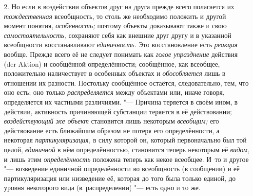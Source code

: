 2. Но если в воздействии объектов друг на друга прежде всего
полагается их {\em тождественная}
всеобщность, то столь же необходимо положить и другой момент
понятия, {\em особенность;}
поэтому объекты доказывают также и свою
{\em самостоятельность,}
сохраняют себя как внешние друг другу и в указанной
всеобщности восстанавливают
{\em единичность}. Это
восстановление есть {\em реакция}
вообще. Прежде всего её не следует понимать
как {\em голое упразднение}
действия (der Aktion) и сообщённой
определённости; сообщённое, как всеобщее, положительно наличествует в
особенных объектах и {\em обособляется}
лишь в отношении их разности. Постольку сообщённое остаётся,
следовательно, тем, что оно есть; оно только
{\em распределяется}
между объектами или, иначе говоря, определяется их частными
различиями. "--- Причина теряется в своём ином, в действии,
активность причиняющей субстанции теряется в её действовании;
{\em воздействующий же объект}
становится лишь некоторым
{\em всеобщим;} его
действование есть ближайшим образом не потеря его определённости, а
некоторая {\em партикуляризация,}
в силу которой он, который первоначально был той целой,
{\em единичной} в нём
определённостью, становится теперь некоторым её
{\em видом,} и лишь этим
{\em определённость}
положена теперь как некое всеобщее. И~то и другое
"--- возведение единичной определённости во всеобщность (в
сообщении) и её партикуляризация или низведение её, которая до того была
только единой, до уровня некоторого вида (в~распределении)
"--- есть одно и то
же.

